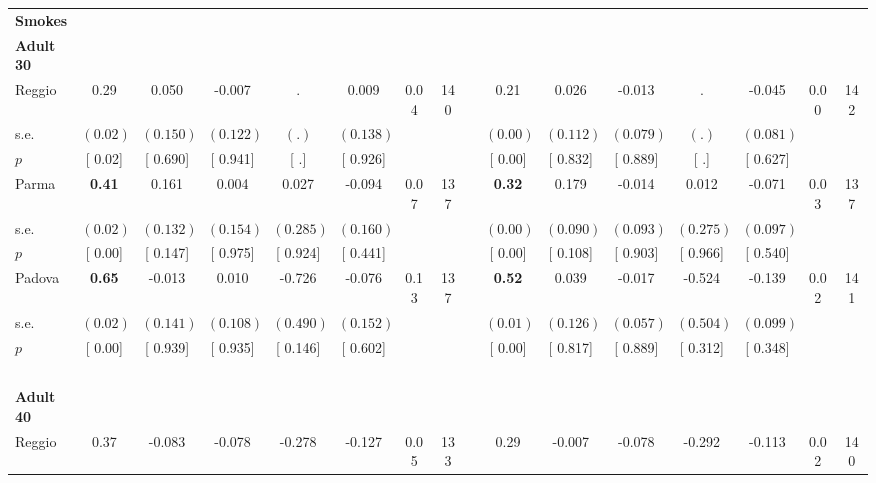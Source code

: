 \begin{longtable}{L{8em} c c c c c c c p{1em} c c c c c c c}
\textbf{Smokes} \\*
\quad \quad \textbf{Adult 30} & & & & & & & & & & & & & & & \\* 
\quad \quad \quad Reggio& 0.29 &     0.050 &    -0.007 &         . &     0.009 &      0.04 &       140 & & 0.21 &     0.026 &    -0.013 &         . &    -0.045 &      0.00 &       142  \\*
\quad \quad \quad \quad s.e.& $ (     0.02)$ & $ (    0.150)$ & $ (    0.122)$ & $ (        .)$ & $ (    0.138)$ & & & & $ (     0.00)$ & $ (    0.112)$ & $ (    0.079)$ & $ (        .)$ & $ (    0.081)$ & &  \\*
\quad \quad \quad \quad $ p$ & [     0.02] & [    0.690] & [    0.941] & [        .] & [    0.926] & & & & [     0.00] & [    0.832] & [    0.889] & [        .] & [    0.627] & &  \\[1em]
\quad \quad \quad Parma& \textbf{     0.41} &     0.161 &     0.004 &     0.027 &    -0.094 &      0.07 &       137 & & \textbf{     0.32} &     0.179 &    -0.014 &     0.012 &    -0.071 &      0.03 &       137  \\*
\quad \quad \quad \quad s.e.& $ (     0.02)$ & $ (    0.132)$ & $ (    0.154)$ & $ (    0.285)$ & $ (    0.160)$ & & & & $ (     0.00)$ & $ (    0.090)$ & $ (    0.093)$ & $ (    0.275)$ & $ (    0.097)$ & &  \\*
\quad \quad \quad \quad $ p$ & [     0.00] & [    0.147] & [    0.975] & [    0.924] & [    0.441] & & & & [     0.00] & [    0.108] & [    0.903] & [    0.966] & [    0.540] & &  \\[1em]
\quad \quad \quad Padova& \textbf{     0.65} &    -0.013 &     0.010 &    -0.726 &    -0.076 &      0.13 &       137 & & \textbf{     0.52} &     0.039 &    -0.017 &    -0.524 &    -0.139 &      0.02 &       141  \\*
\quad \quad \quad \quad s.e.& $ (     0.02)$ & $ (    0.141)$ & $ (    0.108)$ & $ (    0.490)$ & $ (    0.152)$ & & & & $ (     0.01)$ & $ (    0.126)$ & $ (    0.057)$ & $ (    0.504)$ & $ (    0.099)$ & &  \\*
\quad \quad \quad \quad $ p$ & [     0.00] & [    0.939] & [    0.935] & [    0.146] & [    0.602] & & & & [     0.00] & [    0.817] & [    0.889] & [    0.312] & [    0.348] & &  \\[1em]
~\\[1em]
\quad \quad \textbf{Adult 40} & & & & & & & & & & & & & & & \\* 
\quad \quad \quad Reggio& 0.37 &    -0.083 &    -0.078 &    -0.278 &    -0.127 &      0.05 &       133 & & 0.29 &    -0.007 &    -0.078 &    -0.292 &    -0.113 &      0.02 &       140  \\*

\end{longtable}
